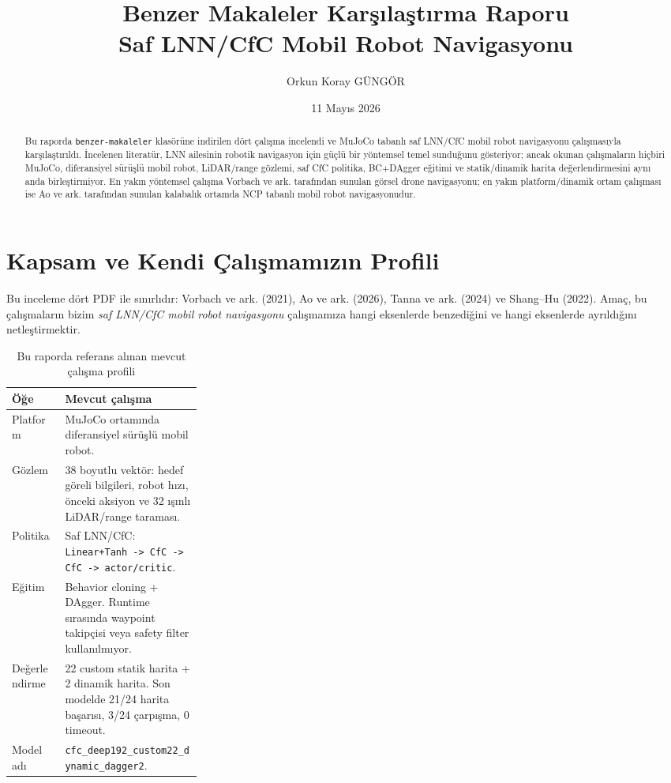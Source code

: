 \documentclass[11pt,a4paper]{article}
\title{\textbf{Benzer Makaleler Karşılaştırma Raporu}\\
Saf LNN/CfC Mobil Robot Navigasyonu}
\author{Orkun Koray GÜNGÖR}
\date{11 Mayıs 2026}
\newcommand{\code}[1]{\texttt{#1}}
\begin{document}
\shorthandoff{=}
\maketitle

\begin{abstract}
Bu raporda \code{benzer-makaleler} klasörüne indirilen dört çalışma incelendi ve
MuJoCo tabanlı saf LNN/CfC mobil robot navigasyonu çalışmasıyla karşılaştırıldı.
İncelenen literatür, LNN ailesinin robotik navigasyon için güçlü bir yöntemsel
temel sunduğunu gösteriyor; ancak okunan çalışmaların hiçbiri MuJoCo,
diferansiyel sürüşlü mobil robot, LiDAR/range gözlemi, saf CfC politika,
BC+DAgger eğitimi ve statik/dinamik harita değerlendirmesini aynı anda
birleştirmiyor. En yakın yöntemsel çalışma Vorbach ve ark. tarafından sunulan
görsel drone navigasyonu; en yakın platform/dinamik ortam çalışması ise Ao ve
ark. tarafından sunulan kalabalık ortamda NCP tabanlı mobil robot
navigasyonudur.
\end{abstract}

\section{Kapsam ve Kendi Çalışmamızın Profili}

Bu inceleme dört PDF ile sınırlıdır: Vorbach ve ark. (2021), Ao ve ark. (2026),
Tanna ve ark. (2024) ve Shang--Hu (2022). Amaç, bu çalışmaların bizim
\emph{saf LNN/CfC mobil robot navigasyonu} çalışmamıza hangi eksenlerde
benzediğini ve hangi eksenlerde ayrıldığını netleştirmektir.

\begin{table}[H]
\centering
\caption{Bu raporda referans alınan mevcut çalışma profili}
\begin{tabularx}{\linewidth}{@{}p{0.28\linewidth}Y@{}}
\toprule
\textbf{Öğe} & \textbf{Mevcut çalışma} \\
\midrule
Platform & MuJoCo ortamında diferansiyel sürüşlü mobil robot. \\
Gözlem & 38 boyutlu vektör: hedef göreli bilgileri, robot hızı, önceki aksiyon ve 32 ışınlı LiDAR/range taraması. \\
Politika & Saf LNN/CfC: \code{Linear+Tanh -> CfC -> CfC -> actor/critic}. \\
Eğitim & Behavior cloning + DAgger. Runtime sırasında waypoint takipçisi veya safety filter kullanılmıyor. \\
Değerlendirme & 22 custom statik harita + 2 dinamik harita. Son modelde 21/24 harita başarısı, 3/24 çarpışma, 0 timeout. \\
Model adı & \code{cfc\_deep192\_custom22\_dynamic\_dagger2}. \\
\bottomrule
\end{tabularx}
\end{table}
\end{document}
